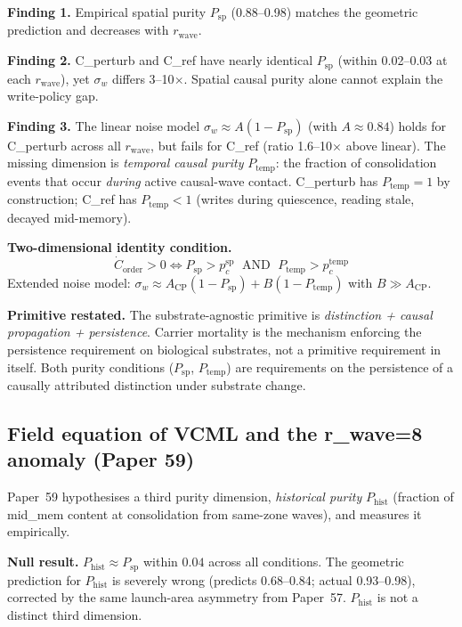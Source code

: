 \documentclass[11pt]{article}
\begin{document}
\textbf{Finding 1.} Empirical spatial purity $P_\text{sp}$ (0.88--0.98) matches the
geometric prediction and decreases with $r_\text{wave}$.

\textbf{Finding 2.} C\_perturb and C\_ref have nearly identical $P_\text{sp}$
(within 0.02--0.03 at each $r_\text{wave}$), yet $\sigma_w$ differs 3--10$\times$.
Spatial causal purity alone cannot explain the write-policy gap.

\textbf{Finding 3.} The linear noise model $\sigma_w \approx A(1-P_\text{sp})$
(with $A \approx 0.84$) holds for C\_perturb across all $r_\text{wave}$, but fails
for C\_ref (ratio 1.6--10$\times$ above linear).
The missing dimension is \emph{temporal causal purity} $P_\text{temp}$: the fraction
of consolidation events that occur \emph{during} active causal-wave contact.
C\_perturb has $P_\text{temp}=1$ by construction; C\_ref has $P_\text{temp} < 1$
(writes during quiescence, reading stale, decayed mid-memory).

\textbf{Two-dimensional identity condition.}
\begin{equation*}
  \dot{C}_\text{order} > 0 \iff P_\text{sp} > p_c^\text{sp}
  \;\text{ AND }\; P_\text{temp} > p_c^\text{temp}
\end{equation*}
Extended noise model: $\sigma_w \approx A_\text{CP}(1-P_\text{sp}) + B(1-P_\text{temp})$
with $B \gg A_\text{CP}$.

\textbf{Primitive restated.}
The substrate-agnostic primitive is \emph{distinction + causal propagation + persistence}.
Carrier mortality is the mechanism enforcing the persistence requirement on biological
substrates, not a primitive requirement in itself.
Both purity conditions ($P_\text{sp}$, $P_\text{temp}$) are requirements on the
persistence of a causally attributed distinction under substrate change.

\subsection{Field equation of VCML and the r\_wave=8 anomaly (Paper 59)}

Paper~59 hypothesises a third purity dimension, \emph{historical purity}
$P_\text{hist}$ (fraction of mid\_mem content at consolidation from same-zone waves),
and measures it empirically.

\textbf{Null result.}
$P_\text{hist} \approx P_\text{sp}$ within $0.04$ across all conditions.
The geometric prediction for $P_\text{hist}$ is severely wrong
(predicts 0.68--0.84; actual 0.93--0.98), corrected by the same launch-area asymmetry
from Paper~57.
$P_\text{hist}$ is not a distinct third dimension.
\end{document}
